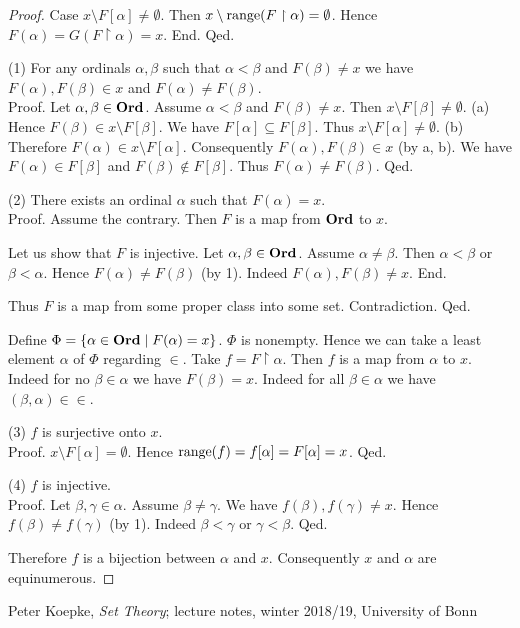 \documentclass{article}
\begin{document}
\begin{forthel}
\begin{proof}
        Case $x \setminus F[\alpha] \neq \emptyset$.
          Then $x \setminus \operatorname{range}(F \restriction \alpha) = \emptyset$.
          Hence $F(\alpha)
            = G(F \restriction \alpha)
            = x$.
        End.
      Qed.

      (1) For any ordinals $\alpha, \beta$ such that $\alpha < \beta$ and
      $F(\beta) \neq x$ we have $F(\alpha), F(\beta) \in x$ and $F(\alpha) \neq
      F(\beta)$. \\
      Proof.
        Let $\alpha, \beta \in \mathbf{Ord}$.
        Assume $\alpha < \beta$ and $F(\beta) \neq x$.
        Then $x \setminus F[\beta] \neq \emptyset$.
        (a) Hence $F(\beta) \in x \setminus F[\beta]$.
        We have $F[\alpha] \subseteq F[\beta]$.
        Thus $x \setminus F[\alpha] \neq \emptyset$.
        (b) Therefore $F(\alpha) \in x \setminus F[\alpha]$.
        Consequently $F(\alpha), F(\beta) \in x$ (by a, b).
        We have $F(\alpha) \in F[\beta]$ and $F(\beta) \notin F[\beta]$.
        Thus $F(\alpha) \neq F(\beta)$.
      Qed.

      (2) There exists an ordinal $\alpha$ such that $F(\alpha) = x$. \\
      Proof.
        Assume the contrary.
        Then $F$ is a map from $\mathbf{Ord}$ to $x$.

        Let us show that $F$ is injective.
          Let $\alpha, \beta \in \mathbf{Ord}$.
          Assume $\alpha \neq \beta$.
          Then $\alpha < \beta$ or $\beta < \alpha$.
          Hence $F(\alpha) \neq F(\beta)$ (by 1).
          Indeed $F(\alpha), F(\beta) \neq x$.
        End.

        Thus $F$ is a map from some proper class into some set.
        Contradiction.
      Qed.

      Define $\Phi = \{ \alpha \in \mathbf{Ord} \mid F(\alpha) = x \}$.
      $\Phi$ is nonempty.
      Hence we can take a least element $\alpha$ of $\Phi$ regarding ${\in}$.
      Take $f = F \restriction \alpha$.
      Then $f$ is a map from $\alpha$ to $x$.
      Indeed for no $\beta \in \alpha$ we have $F(\beta) = x$.
      Indeed for all $\beta \in \alpha$ we have $(\beta, \alpha) \in {\in}$.

      (3) $f$ is surjective onto $x$. \\
      Proof.
        $x \setminus F[\alpha] = \emptyset$.
        Hence $\operatorname{range}(f)
          = f[\alpha]
          = F[\alpha]
          = x$.
      Qed.

      (4) $f$ is injective. \\
      Proof.
        Let $\beta, \gamma \in \alpha$.
        Assume $\beta \neq \gamma$.
        We have $f(\beta), f(\gamma) \neq x$.
        Hence $f(\beta) \neq f(\gamma)$ (by 1).
        Indeed $\beta < \gamma$ or $\gamma < \beta$.
      Qed.

      Therefore $f$ is a bijection between $\alpha$ and $x$.
      Consequently $x$ and $\alpha$ are equinumerous.
    \end{proof}
  \end{forthel}

  \begin{thebibliography}{1}
     Peter Koepke,
    \textit{Set Theory};
    lecture notes,
    winter 2018/19,
    University of Bonn
  \end{thebibliography}
\end{document}

